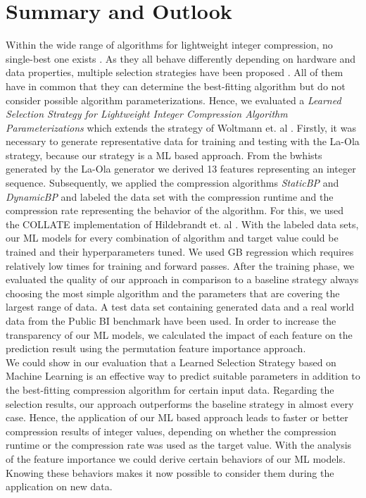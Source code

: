 \chapter{Summary and Outlook}

Within the wide range of algorithms for lightweight integer compression, no single-best one exists \cite{Damme2017, Damme2019}. As they all behave differently depending on hardware and data properties, multiple selection strategies have been proposed \cite{Damme2019, Woltmann2021}. All of them have in common that they can determine the best-fitting algorithm but do not consider possible algorithm parameterizations. Hence, we evaluated a \emph{Learned Selection Strategy for Lightweight Integer Compression Algorithm Parameterizations} which extends the strategy of Woltmann et. al \cite{Woltmann2021}.
Firstly, it was necessary to generate representative data for training and testing with the La-Ola strategy, because our strategy is a ML based approach. From the bwhists generated by the La-Ola generator we derived 13 features representing an integer sequence. Subsequently, we applied the compression algorithms \emph{StaticBP} and \emph{DynamicBP} and labeled the data set with the compression runtime and the compression rate representing the behavior of the algorithm. For this, we used the COLLATE implementation of Hildebrandt et. al \cite{Hildebrandt2017}. With the labeled data sets, our ML models for every combination of algorithm and target value could be trained and their hyperparameters tuned. We used GB regression which requires relatively low times for training and forward passes. 
After the training phase, we evaluated the quality of our approach in comparison to a baseline strategy always choosing the most simple algorithm and the parameters that are covering the largest range of data. A test data set containing generated data and a real world data from the Public BI benchmark have been used. 
In order to increase the transparency of our ML models, we calculated the impact of each feature on the prediction result using the permutation feature importance approach.\\
We could show in our evaluation that a Learned Selection Strategy based on Machine Learning is an effective way to predict suitable parameters in addition to the best-fitting compression algorithm for certain input data. Regarding the selection results, our approach outperforms the baseline strategy in almost every case. Hence, the application of our ML based approach leads to faster or better compression results of integer values, depending on whether the compression runtime or the compression rate was used as the target value. With the analysis of the feature importance we could derive certain behaviors of our ML models. Knowing these behaviors makes it now possible to consider them during the application on new data.

